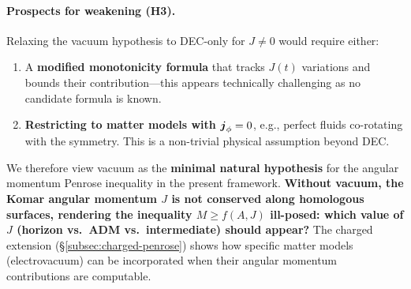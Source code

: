 \begin{remark}
\paragraph{Prospects for weakening (H3).}
Relaxing the vacuum hypothesis to DEC-only for $J \neq 0$ would require either:
\begin{enumerate}[label=(\alph*)]
    \item A \textbf{modified monotonicity formula} that tracks $J(t)$ variations and bounds their contribution---this appears technically challenging as no candidate formula is known.
    \item \textbf{Restricting to matter models with $\boldsymbol{j}_\phi = 0$}, e.g., perfect fluids co-rotating with the symmetry. This is a non-trivial physical assumption beyond DEC.
\end{enumerate}
We therefore view vacuum as the \textbf{minimal natural hypothesis} for the angular momentum Penrose inequality in the present framework. \textbf{Without vacuum, the Komar angular momentum $J$ is not conserved along homologous surfaces, rendering the inequality $M \geq f(A, J)$ ill-posed: which value of $J$ (horizon vs.\ ADM vs.\ intermediate) should appear?} The charged extension (\S\ref{subsec:charged-penrose}) shows how specific matter models (electrovacuum) can be incorporated when their angular momentum contributions are computable.


\end{remark}
